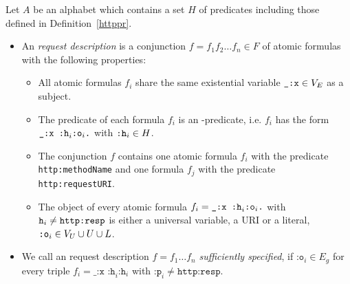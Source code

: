 \begin{definition}
  \label{def:HttpRequestDescription}
 Let $A$ be an \nthree alphabet which contains a set $H$ of \http predicates including those defined in Definition~\ref{httppr}. 
  \begin{itemize}
\item An \emph{\http request description} is a conjunction $f=f_1 f_2 \ldots f_n\in F$ of atomic formulas with the following properties:
\begin{itemize}
 \item All atomic formulas $f_i$ share the same existential variable $\verb!_:x!\in V_E$ as a subject.
 \item The predicate of each formula $f_i$ is an \http-predicate, i.e. $f_i$ has the form $\verb!_:x :h!_i \verb!:o!_i\verb!.!$ with $\verb!:h!_i\in H$.
 \item The conjunction $f$ contains one atomic formula $f_i$ with the predicate\linebreak \verb! http:methodName!
 and one formula $f_j$ with the predicate\linebreak 
 \verb! http:requestURI!.
 \item The object of every atomic formula $f_i=\verb!_:x :h!_i \verb!:o!_i\verb!.!$ with $\verb!h!_i \neq \verb!http:resp!$ is either a universal variable, 
 a URI or a literal, $\verb!:o!_i\in V_U\cup U\cup L$.
\end{itemize}

%  
\item  We call an \http request description $f=f_1\ldots f_n$ \textit{sufficiently specified},
if  $\texttt{:o}_i\in E_g$ for every triple $f_i=\texttt{\_:x :h}_i \texttt{:h}_i$ with $\texttt{:p}_i\neq \texttt{http:resp}$. %
\end{itemize}

\end{definition}


